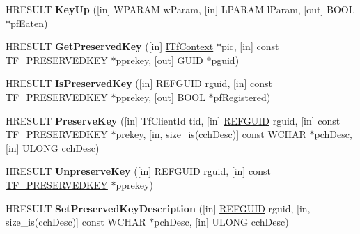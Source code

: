 \begin{DoxyCompactItemize}
H\+R\+E\+S\+U\+LT {\bfseries Key\+Up} (\mbox{[}in\mbox{]} W\+P\+A\+R\+AM w\+Param, \mbox{[}in\mbox{]} L\+P\+A\+R\+AM l\+Param, \mbox{[}out\mbox{]} B\+O\+OL $\ast$pf\+Eaten)
\item 
\mbox{\label{interface_i_tf_keystroke_mgr_a5162df0c6c5f8c8308b67e71210c1dfb}} 
H\+R\+E\+S\+U\+LT {\bfseries Get\+Preserved\+Key} (\mbox{[}in\mbox{]} \hyperlink{interface_i_tf_context}{I\+Tf\+Context} $\ast$pic, \mbox{[}in\mbox{]} const \hyperlink{struct_t_f___p_r_e_s_e_r_v_e_d_k_e_y}{T\+F\+\_\+\+P\+R\+E\+S\+E\+R\+V\+E\+D\+K\+EY} $\ast$pprekey, \mbox{[}out\mbox{]} \hyperlink{interface_g_u_i_d}{G\+U\+ID} $\ast$pguid)
\item 
\mbox{\label{interface_i_tf_keystroke_mgr_a06e11c4db478b1b56f21611b21f81d7f}} 
H\+R\+E\+S\+U\+LT {\bfseries Is\+Preserved\+Key} (\mbox{[}in\mbox{]} \hyperlink{struct___g_u_i_d}{R\+E\+F\+G\+U\+ID} rguid, \mbox{[}in\mbox{]} const \hyperlink{struct_t_f___p_r_e_s_e_r_v_e_d_k_e_y}{T\+F\+\_\+\+P\+R\+E\+S\+E\+R\+V\+E\+D\+K\+EY} $\ast$pprekey, \mbox{[}out\mbox{]} B\+O\+OL $\ast$pf\+Registered)
\item 
\mbox{\label{interface_i_tf_keystroke_mgr_aa286e8523d9e8e901687194eacb1456b}} 
H\+R\+E\+S\+U\+LT {\bfseries Preserve\+Key} (\mbox{[}in\mbox{]} Tf\+Client\+Id tid, \mbox{[}in\mbox{]} \hyperlink{struct___g_u_i_d}{R\+E\+F\+G\+U\+ID} rguid, \mbox{[}in\mbox{]} const \hyperlink{struct_t_f___p_r_e_s_e_r_v_e_d_k_e_y}{T\+F\+\_\+\+P\+R\+E\+S\+E\+R\+V\+E\+D\+K\+EY} $\ast$prekey, \mbox{[}in, size\+\_\+is(cch\+Desc)\mbox{]} const W\+C\+H\+AR $\ast$pch\+Desc, \mbox{[}in\mbox{]} U\+L\+O\+NG cch\+Desc)
\item 
\mbox{\label{interface_i_tf_keystroke_mgr_a301241d933658d3975c30e43890ca57d}} 
H\+R\+E\+S\+U\+LT {\bfseries Unpreserve\+Key} (\mbox{[}in\mbox{]} \hyperlink{struct___g_u_i_d}{R\+E\+F\+G\+U\+ID} rguid, \mbox{[}in\mbox{]} const \hyperlink{struct_t_f___p_r_e_s_e_r_v_e_d_k_e_y}{T\+F\+\_\+\+P\+R\+E\+S\+E\+R\+V\+E\+D\+K\+EY} $\ast$pprekey)
\item 
\mbox{\label{interface_i_tf_keystroke_mgr_ad59ba7031014b5165372cac927ddd926}} 
H\+R\+E\+S\+U\+LT {\bfseries Set\+Preserved\+Key\+Description} (\mbox{[}in\mbox{]} \hyperlink{struct___g_u_i_d}{R\+E\+F\+G\+U\+ID} rguid, \mbox{[}in, size\+\_\+is(cch\+Desc)\mbox{]} const W\+C\+H\+AR $\ast$pch\+Desc, \mbox{[}in\mbox{]} U\+L\+O\+NG cch\+Desc)

\end{DoxyCompactItemize}
